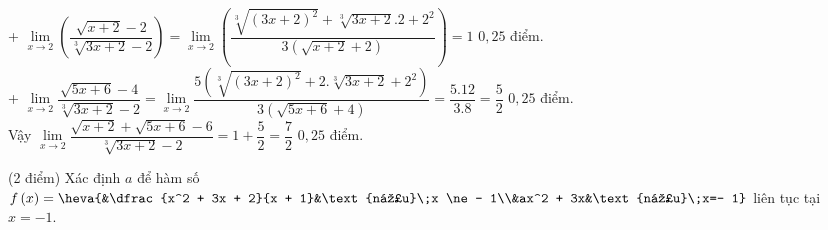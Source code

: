 \begin{bt}
{\begin{enumerate}
			+ $\mathop {\lim }\limits_{x \to 2} \left( {\dfrac{{\sqrt {x + 2} - 2}}{{\sqrt[3]{{3x + 2}} - 2}}} \right) = \mathop {\lim }\limits_{x \to 2} \left( {\dfrac{{\sqrt[3]{{{{\left( {3x + 2} \right)}^2}}} + \sqrt[3]{{3x + 2}}.2 + {2^2}}}{{3\left( {\sqrt {x + 2} + 2} \right)}}} \right) = 1$ \dotfill $0{,}25$ điểm.\\
			+ $\mathop {\lim }\limits_{x \to 2} \dfrac{{\sqrt {5x + 6} - 4}}{{\sqrt[3]{{3x + 2}} - 2}} = \mathop {\lim }\limits_{x \to 2} \dfrac{{5\left( {\sqrt[3]{{{{\left( {3x + 2} \right)}^2}}} + 2.\sqrt[3]{{3x + 2}} + {2^2}} \right)}}{{3\left( {\sqrt {5x + 6} + 4} \right)}} = \dfrac{{5.12}}{{3.8}} = \dfrac{5}{2}$ \dotfill $0{,}25$ điểm.\\
			Vậy $\mathop {\lim }\limits_{x \to 2} \dfrac{{\sqrt {x + 2} + \sqrt {5x + 6} - 6}}{{\sqrt[3]{{3x + 2}} - 2}} = 1+\dfrac{5}{2}=\dfrac{7}{2}$ \dotfill $0{,}25$ điểm.
		\end{enumerate}
	}
\end{bt}

\begin{bt} %
	(2 điểm)
	Xác định $a$ để hàm số $f\left( x \right) = \heva{&\dfrac{x^2 + 3x + 2}{x + 1}&\text{nếu}\;x \ne - 1\\&ax^2 + 3x&\text{nếu}\;x=- 1}$ liên tục tại $x = -1$.
\end{bt}

